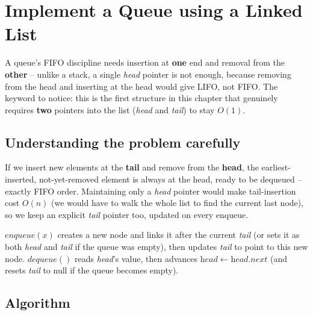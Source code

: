 \section{Implement a Queue using a Linked List}
\label{sec:sq-queue-linked-list}


\begin{patternbox}
A queue's FIFO discipline needs insertion at \textbf{one} end and removal
from the \textbf{other} -- unlike a stack, a single \textit{head} pointer
is not enough, because removing from the head and inserting at the head
would give LIFO, not FIFO. The keyword to notice: this is the first
structure in this chapter that genuinely requires \textbf{two} pointers
into the list (\textit{head} and \textit{tail}) to stay $O(1)$.
\end{patternbox}

\subsection*{Understanding the problem carefully}

If we insert new elements at the \textbf{tail} and remove from the
\textbf{head}, the earliest-inserted, not-yet-removed element is always
at the head, ready to be dequeued -- exactly FIFO order. Maintaining only
a \textit{head} pointer would make tail-insertion cost $O(n)$ (we would
have to walk the whole list to find the current last node), so we keep an
explicit \textit{tail} pointer too, updated on every enqueue.

\begin{ideabox}
$\textit{enqueue}(x)$ creates a new node and links it after the current
\textit{tail} (or sets it as both \textit{head} and \textit{tail} if the
queue was empty), then updates \textit{tail} to point to this new node.
$\textit{dequeue}()$ reads \textit{head}'s value, then advances
$\textit{head} \gets \textit{head}.\textit{next}$ (and resets
\textit{tail} to null if the queue becomes empty).
\end{ideabox}

\subsection*{Algorithm}

